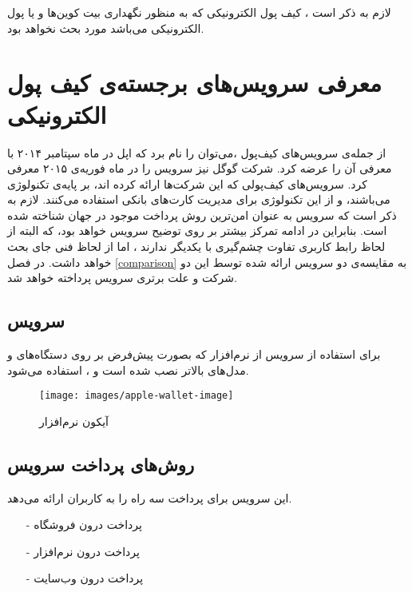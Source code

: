 \documentclass[oneside]{report}
\begin{document}
			  لازم به ذکر است ، کیف پول الکترونیکی که به منظور نگهداری بیت کوین‌ها
			  و یا پول الکترونیکی می‌باشد مورد بحث نخواهد بود.
			  
				\section{معرفی سرویس‌های برجسته‌ی کیف پول الکترونیکی }
		
		از جمله‌ی سرویس‌های کیف‌پول ،می‌توان 
				{\large {}} 
		را نام برد که اپل در ماه سپتامبر ۲۰۱۴ با معرفی 
				{\large {}} 
		آن را عرضه کرد.	شرکت گوگل نیز سرویس 
						{\large {}} 
		را در ماه فوریه‌ی ۲۰۱۵ معرفی کرد. سرویس‌های کیف‌پولی که این شرکت‌ها ارائه کرده اند، بر پایه‌ی تکنولوژی 
			{\large {}}
			می‌باشند، و از این تکنولوژی برای مدیریت کارت‌های بانکی استفاده می‌کنند. لازم به ذکر است که سرویس 
						{\large {}} 
						به عنوان امن‌ترین روش پرداخت موجود در جهان شناخته شده است. 
						\cite{mostsecureBellID}
						بنابراین در ادامه تمرکز بیشتر بر روی توضیح سرویس
							 									 {\large {}}
							 									 خواهد بود، که البته از لحاظ رابط کاربری تفاوت چشم‌گیری با یکدیگر ندارند ، اما از لحاظ فنی جای بحث خواهد داشت.
			در فصل \ref{comparison} به مقایسه‌ی دو سرویس ارائه شده توسط این دو شرکت  و علت برتری سرویس
										{\large {}} 
			پرداخته خواهد شد.
		
		\subsection{ سرویس {\normalsize{}}}
		برای استفاده از سرویس 
								{\large {}} 
								از نرم‌افزار
														{\large {}} 
		که بصورت پیش‌فرض بر روی دستگاه‌های
								{\large {}} 
								و مدل‌های بالاتر نصب شده است و 
																{\large {}} 
							،	 استفاده می‌شود. 
		\begin{figure}[h]
			\centering
			\texttt{[image: images/apple-wallet-image]}
			\caption{آیکون نرم‌افزار {\footnotesize {}} }
			\label{wallet-image}
		\end{figure}
	\subsection{روش‌های پرداخت سرویس {\large {}} }
	این سرویس برای پرداخت سه راه را به کاربران ارائه می‌دهد.
	\begin{itemize}
		\item[-] پرداخت درون فروشگاه 
		‌\item[-] پرداخت درون نرم‌افزار
		\item[-]پرداخت درون وب‌سایت
	\end{itemize}
\end{document}

